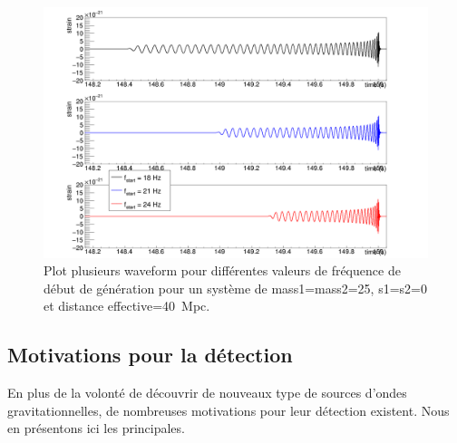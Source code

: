 % 
\begin{figure}
  \includegraphics[width=\linewidth]{sectionGW/cWaveformFreq.png}
  \caption{Plot plusieurs waveform pour différentes valeurs de fréquence de début de génération pour un système de mass1=mass2=\SI{25}{\msun}, s1=s2=0 et distance effective=\SI{40}{Mpc}.}
  \label{fig:waveform_startFreq}
\end{figure}



\subsection{Motivations pour la détection}
\label{sec:motivations}
En plus de la volonté de découvrir de nouveaux type de sources d'ondes gravitationnelles, de nombreuses motivations pour leur détection existent.
Nous en présentons ici les principales.

